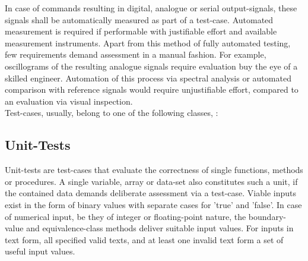 \documentclass[master,english,smartquotes,apa]{hgbthesis}
\begin{document}
			
			In case of commands resulting in digital, analogue or serial output-signals, these signals shall be automatically measured as part of a test-case. Automated measurement is required if performable with justifiable effort and available measurement instruments. Apart from this method of fully automated testing, few requirements demand assessment in a manual fashion. For example, oscillograms of the resulting analogue signals require evaluation buy the eye of a skilled engineer. Automation of this process via spectral analysis or automated comparison with reference signals would require unjustifiable effort, compared to an evaluation via visual inspection. \\
			Test-cases, usually, belong to one of the following classes, :
			\subsection{Unit-Tests}
			Unit-tests are test-cases that evaluate the correctness of single functions, methods or procedures. A single variable, array or data-set also constitutes such a unit, if the contained data demands deliberate assessment via a test-case. Viable inputs exist in the form of binary values with separate cases for 'true' and 'false'. In case of numerical input, be they of integer or floating-point nature, the boundary-value and equivalence-class methods deliver suitable input values. For inputs in text form, all specified valid texts, and at least one invalid text form a set of useful input values. \cite{jorgensen13}
\end{document}
